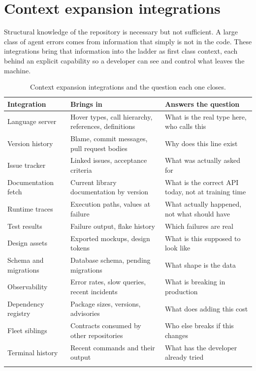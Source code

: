 \section{Context expansion integrations}

Structural knowledge of the repository is necessary but not sufficient. A large class of
agent errors comes from information that simply is not in the code. These integrations bring
that information into the ladder as first class context, each behind an explicit capability
so a developer can see and control what leaves the machine.

\begin{longtable}{@{}p{} p{} p{}@{}}
\toprule
\textbf{Integration} & \textbf{Brings in} & \textbf{Answers the question} \\
\midrule
\endhead
Language server & Hover types, call hierarchy, references, definitions & What is the real type here, who calls this \\
Version history & Blame, commit messages, pull request bodies & Why does this line exist \\
Issue tracker & Linked issues, acceptance criteria & What was actually asked for \\
Documentation fetch & Current library documentation by version & What is the correct API today, not at training time \\
Runtime traces & Execution paths, values at failure & What actually happened, not what should have \\
Test results & Failure output, flake history & Which failures are real \\
Design assets & Exported mockups, design tokens & What is this supposed to look like \\
Schema and migrations & Database schema, pending migrations & What shape is the data \\
Observability & Error rates, slow queries, recent incidents & What is breaking in production \\
Dependency registry & Package sizes, versions, advisories & What does adding this cost \\
Fleet siblings & Contracts consumed by other repositories & Who else breaks if this changes \\
Terminal history & Recent commands and their output & What has the developer already tried \\
\bottomrule
\caption{Context expansion integrations and the question each one closes.}
\end{longtable}

